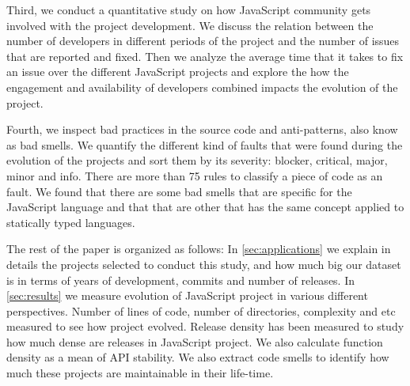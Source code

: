 Third, we conduct a quantitative study on how JavaScript community gets involved with the project development. We discuss the relation between the number of developers in different periods of the project and the number of issues that are reported and fixed. Then we analyze the average time that it takes to fix an issue over the different JavaScript projects and explore the how the engagement and availability of developers combined impacts the evolution of the project. 

Fourth, we inspect bad practices in the source code and anti-patterns, also know as bad smells. We quantify the different kind of faults that were found during the evolution of the projects and sort them by its severity: blocker, critical, major, minor and info. There are more than 75 rules to classify a piece of code as an fault. We found that there are some bad smells that are specific for the JavaScript language and that that are other that has the same concept applied to statically typed languages.

The rest of the paper is organized as follows: In \ref{sec:applications} we explain in details the projects selected to conduct this study, and how much big our dataset is in terms of years of development, commits and number of releases. In \ref{sec:results} we measure evolution of JavaScript project in various different perspectives. Number of lines of code, number of directories, complexity and etc measured to see how project evolved. Release density has been measured to study how much dense are releases in JavaScript project. We also calculate function density as a mean of API stability. We also extract code smells to identify how much these projects are maintainable in their life-time.